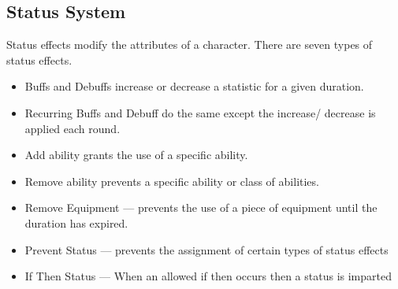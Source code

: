\subsection{Status System}
Status effects modify the attributes of a character.  There are seven types of status effects.  
\begin{itemize}
\item Buffs and Debuffs increase or decrease a statistic for a given duration.  
\item Recurring Buffs and Debuff do the same except the increase/
decrease is applied each round.
\item Add ability grants the use of a specific ability.
\item Remove ability prevents a specific ability or class of abilities.
\item Remove Equipment --- prevents the use of a piece of equipment until the duration has expired.
\item Prevent Status --- prevents the assignment of certain types of status effects
\item If Then Status --- When an allowed if then occurs then a status is imparted
\end{itemize}
